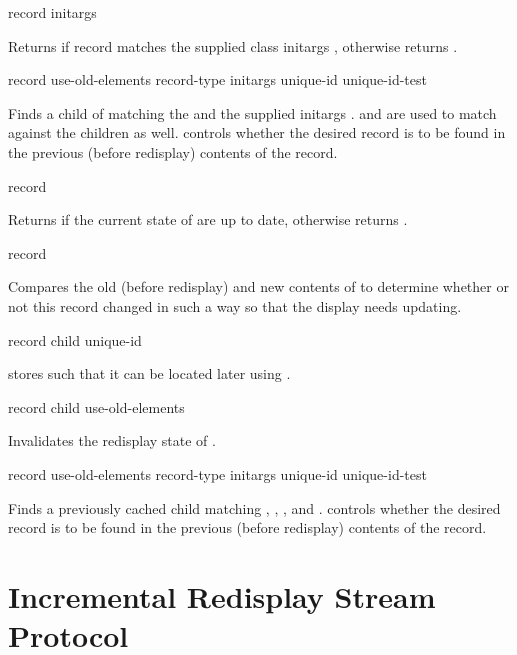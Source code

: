  {record \rest initargs}

Returns  if record matches the supplied class initargs
, otherwise returns .

 {record use-old-elements record-type
                                        \rest initargs
                                        \key unique-id unique-id-test}

Finds a child of  matching the  and the supplied
initargs .   and  are used to
match against the children as well.   controls whether the
desired record is to be found in the previous (before redisplay) contents of the
record.

 {record}

Returns  if the current state of  are up to date,
otherwise returns .

 {record}

Compares the old (before redisplay) and new contents of  to
determine whether or not this record changed in such a way so that the display
needs updating.

 {record child unique-id}

 stores  such that it can be located later using
.

 {record child use-old-elements}

Invalidates the redisplay state of .

 {record use-old-elements record-type
                                         \rest initargs
                                         \key unique-id unique-id-test \allow}

Finds a previously cached child matching , ,
, and .   controls
whether the desired record is to be found in the previous (before redisplay)
contents of the record.


\section {Incremental Redisplay Stream Protocol}

